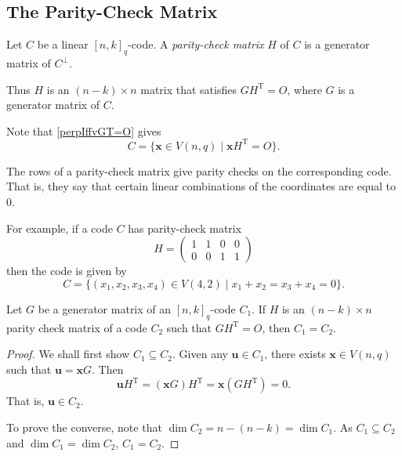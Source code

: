 \subsection{The Parity-Check Matrix}

\begin{definition}
    Let $C$ be a linear $[n,k]_q$-code. A \textit{parity-check matrix} $H$ of $C$ is a generator matrix of $C^\perp$.
\end{definition}

Thus $H$ is an $(n-k)\times n$ matrix that satisfies $GH^\text{T}=O$, where $G$ is a generator matrix of $C$.

Note that \ref{perpIffvGT=O} gives
$$C=\{\textbf{x}\in V(n,q)\mid \textbf{x}H^\text{T}=O\}.$$

The rows of a parity-check matrix give parity checks on the corresponding code. That is, they say that certain linear combinations of the coordinates are equal to $0$.

For example, if a code $C$ has parity-check matrix
$$H=
\begin{pmatrix}
1 & 1 & 0 & 0 \\
0 & 0 & 1 & 1
\end{pmatrix}
$$
then the code is given by
$$C=\{(x_1,x_2,x_3,x_4)\in V(4,2)\mid x_1+x_2=x_3+x_4=0\}.$$

\begin{lemma}
    Let $G$ be a generator matrix of an $[n,k]_q$-code $C_1$. If $H$ is an $(n-k)\times n$ parity check matrix of a code $C_2$ such that $GH^\text{T}=O$, then $C_1=C_2$.
\end{lemma}
\begin{proof}
   We shall first show $C_1\subseteq C_2$. Given any $\textbf{u}\in C_1$, there exists $\textbf{x}\in V(n,q)$ such that $\textbf{u}=\textbf{x}G$. Then
   $$\textbf{u}H^\text{T}=(\textbf{x}G)H^\text{T}=\textbf{x}(GH^\text{T})=0.$$
   That is, $\textbf{u}\in C_2$.
   
   To prove the converse, note that $\dim C_2=n-(n-k)=\dim C_1$.  As $C_1\subseteq C_2$ and $\dim C_1=\dim C_2$, $C_1=C_2$.
\end{proof}

